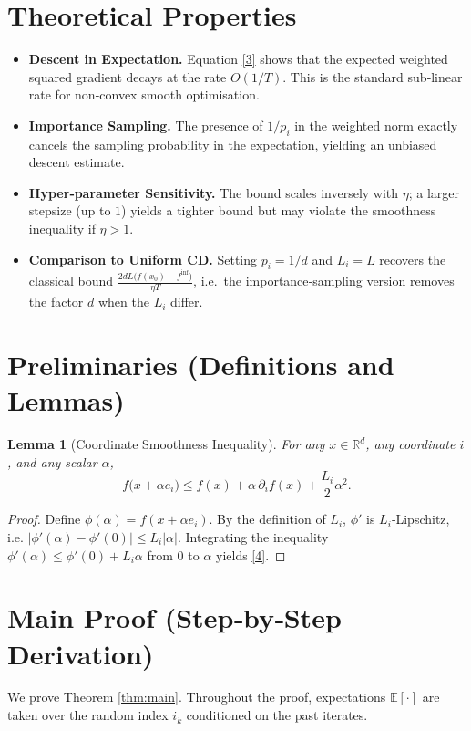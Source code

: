 \documentclass{article}
\newtheorem{lemma}{Lemma}
\newcommand{\E}{\mathbb{E}}
\newcommand{\R}{\mathbb{R}}
\begin{document}
\section*{Theoretical Properties}
\begin{itemize}[leftmargin=*]
\item \textbf{Descent in Expectation.} Equation \eqref{3} shows that the expected weighted squared gradient decays at the rate $O(1/T)$. This is the standard sub‑linear rate for non‑convex smooth optimisation.
\item \textbf{Importance Sampling.} The presence of $1/p_i$ in the weighted norm exactly cancels the sampling probability in the expectation, yielding an unbiased descent estimate.
\item \textbf{Hyper‑parameter Sensitivity.} The bound scales inversely with $\eta$; a larger stepsize (up to $1$) yields a tighter bound but may violate the smoothness inequality if $\eta>1$.
\item \textbf{Comparison to Uniform CD.} Setting $p_i=1/d$ and $L_i=L$ recovers the classical bound $\frac{2dL\big(f(x_0)-f^{\inf}\big)}{\eta T}$, i.e.\ the importance‑sampling version removes the factor $d$ when the $L_i$ differ.
\end{itemize}

\section*{Preliminaries (Definitions and Lemmas)}
\begin{lemma}[Coordinate Smoothness Inequality]\label{lem:smooth}
For any $x\in\R^{d}$, any coordinate $i$, and any scalar $\alpha$,
\[
f\big(x+\alpha e_i\big)\le f(x)+\alpha\,\partial_i f(x)+\frac{L_i}{2}\alpha^{2}.
\tag{4}
\]
\end{lemma}
\begin{proof}
Define $\phi(\alpha)=f(x+\alpha e_i)$. By the definition of $L_i$, $\phi'$ is $L_i$‑Lipschitz, i.e.
$|\phi'(\alpha)-\phi'(0)|\le L_i|\alpha|$. Integrating the inequality
$\phi'(\alpha)\le \phi'(0)+L_i\alpha$ from $0$ to $\alpha$ yields \eqref{4}.
\end{proof}

\section*{Main Proof (Step‑by‑Step Derivation)}
We prove Theorem \ref{thm:main}. Throughout the proof, expectations $\E[\cdot]$ are taken over the random index $i_k$ conditioned on the past iterates.
\end{document}
